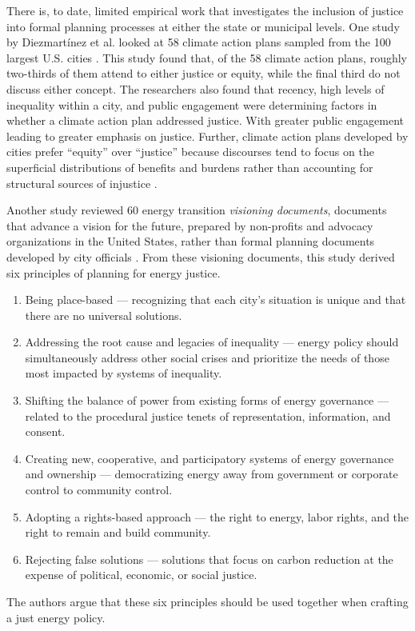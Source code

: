 There is, to date, limited empirical work that investigates the inclusion of
justice into formal planning processes at either the state or municipal levels.
One study by Diezmart\'inez et al. looked at 58 climate action plans sampled
from the 100 largest U.S. cities \cite{diezmartinez_us_2022}. This study found
that, of the 58 climate action plans, roughly two-thirds of them attend to
either justice or equity, while the final third do not discuss either concept.
The researchers also found that recency, high levels of inequality within a
city, and public engagement were determining factors in whether a climate action
plan addressed justice. With greater public engagement leading to greater
emphasis on justice. Further, climate action plans developed by cities prefer
``equity'' over ``justice'' because discourses tend to focus on the superficial
distributions of benefits and burdens rather than accounting for structural
sources of injustice \cite{diezmartinez_us_2022}.

Another study reviewed 60 energy transition \textit{visioning documents},
documents that advance a vision for the future, prepared by non-profits and
advocacy organizations in the United States, rather than formal planning
documents developed by city officials \cite{elmallah_frontlining_2022}. From
these visioning documents, this study derived six principles of planning for
energy justice.
\begin{enumerate}
    \item Being place-based --- recognizing that each city's situation is unique
    and that there are no universal solutions.
    \item Addressing the root cause and legacies of inequality --- energy policy
    should simultaneously address other social crises and prioritize the needs
    of those most impacted by systems of inequality.
    \item Shifting the balance of power from existing forms of energy governance
    --- related to the procedural justice tenets of representation, information,
    and consent.
    \item Creating new, cooperative, and participatory systems of energy
    governance and ownership --- democratizing energy away from government or
    corporate control to community control.
    \item Adopting a rights-based approach --- the right to energy, labor
    rights, and the right to remain and build community.
    \item Rejecting false solutions --- solutions that focus on carbon reduction
    at the expense of political, economic, or social justice.
\end{enumerate}
The authors argue that these six principles should be used together when
crafting a just energy policy.

